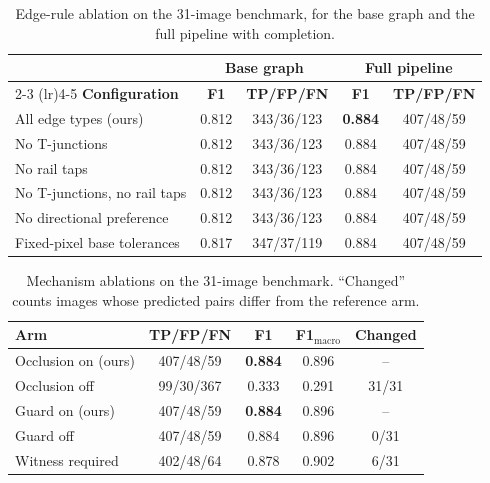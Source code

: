 \documentclass[journal]{IEEEtran}
\begin{document}
\begin{table}[t]
\caption{Edge-rule ablation on the 31-image benchmark, for the base graph and the full pipeline with completion.}
\label{tab:edge_ablation}
\centering
\footnotesize
\setlength{\tabcolsep}{3pt}
\begin{tabular}{lcccc}
\toprule
 & \multicolumn{2}{c}{\textbf{Base graph}} & \multicolumn{2}{c}{\textbf{Full pipeline}} \\
\cmidrule(lr){2-3} \cmidrule(lr){4-5}
\textbf{Configuration} & \textbf{F1} & \textbf{TP/FP/FN} & \textbf{F1} & \textbf{TP/FP/FN} \\
\midrule
All edge types (ours) & 0.812 & 343/36/123 & \textbf{0.884} & 407/48/59 \\
No T-junctions & 0.812 & 343/36/123 & 0.884 & 407/48/59 \\
No rail taps & 0.812 & 343/36/123 & 0.884 & 407/48/59 \\
No T-junctions, no rail taps & 0.812 & 343/36/123 & 0.884 & 407/48/59 \\
No directional preference & 0.812 & 343/36/123 & 0.884 & 407/48/59 \\
Fixed-pixel base tolerances & 0.817 & 347/37/119 & 0.884 & 407/48/59 \\
\bottomrule
\end{tabular}
\end{table}

\begin{table}[t]
\caption{Mechanism ablations on the 31-image benchmark. ``Changed'' counts images whose predicted pairs differ from the reference arm.}
\label{tab:mech_ablation}
\centering
\footnotesize
\setlength{\tabcolsep}{4pt}
\begin{tabular}{lcccc}
\toprule
\textbf{Arm} & \textbf{TP/FP/FN} & \textbf{F1} & \textbf{F1$_{\text{macro}}$} & \textbf{Changed} \\
\midrule
Occlusion on (ours) & 407/48/59 & \textbf{0.884} & 0.896 & -- \\
Occlusion off & 99/30/367 & 0.333 & 0.291 & 31/31 \\
\midrule
Guard on (ours) & 407/48/59 & \textbf{0.884} & 0.896 & -- \\
Guard off & 407/48/59 & 0.884 & 0.896 & 0/31 \\
Witness required & 402/48/64 & 0.878 & 0.902 & 6/31 \\
\bottomrule
\end{tabular}
\end{table}
\end{document}
